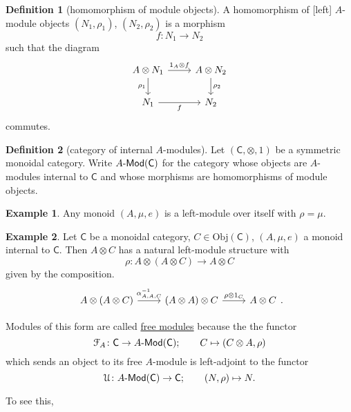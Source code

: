 \documentclass[a4paper,10pt]{scrreprt}
\newcommand{\defn}[1]{\ul{#1}}
\newcommand{\Obj}{\mathrm{Obj}}
\def\mhyp{{\hbox{-}}}
\theoremstyle{definition}
\newtheorem{definition}{Definition}[section]
\newtheorem{example}{Example}[section]
\theoremstyle{plain}
\theoremstyle{remark}
\begin{document}
\begin{definition}[homomorphism of module objects]
  \label{def:homomorphismofmoduleobjects}
  A homomorphism of [left] $A$-module objects $(N_{1}, \rho_{1})$, $(N_{2}, \rho_{2})$ is a morphism
  \begin{equation*}
    f\colon N_{1} \to N_{2}
  \end{equation*}
  such that the diagram
  \begin{equation*}
    \begin{tikzcd}
      A \otimes N_{1}
      \arrow[r, "1_{A} \otimes f"]
      \arrow[d, swap, "\rho_{1}"]
      & A \otimes N_{2}
      \arrow[d, "\rho_{2}"]
      \\
      N_{1}
      \arrow[r, swap, "f"]
      & N_{2}
    \end{tikzcd}
  \end{equation*}
  commutes.
\end{definition}

\begin{definition}[category of internal $A$-modules]
  \label{def:categoryofinternalmodules}
  Let $(\mathsf{C}, \otimes, 1)$ be a symmetric monoidal category. Write $A\mhyp\mathsf{Mod}(\mathsf{C})$ for the category whose objects are $A$-modules internal to $\mathsf{C}$ and whose morphisms are homomorphisms of module objects.
\end{definition}

\begin{example}
  \label{eg:anyringisamoduleoveritself}
  Any monoid $(A, \mu, e)$ is a left-module over itself with $\rho = \mu$.
\end{example}

\begin{example}
  \label{eg:freemodule}
  Let $\mathsf{C}$ be a monoidal category, $C \in \Obj(\mathsf{C})$, $(A, \mu, e)$ a monoid internal to $\mathsf{C}$. Then $A \otimes C$ has a natural left-module structure with
  \begin{equation*}
    \rho\colon A \otimes (A \otimes C) \to A \otimes C
  \end{equation*}
  given by the composition.
  \begin{equation*}
    \begin{tikzcd}
      A \otimes (A \otimes C)
      \arrow[r, "{\alpha_{A, A ,C}^{-1}}"]
      & (A \otimes A) \otimes C
      \arrow[r, "\rho \otimes 1_{C}"]
      & A \otimes C
    \end{tikzcd}.
  \end{equation*}

  Modules of this form are called \defn{free modules} because the the functor 
  \begin{equation*}
    \mathcal{F}_{A}\colon \mathsf{C} \to A\mhyp\mathsf{Mod}(\mathsf{C});\qquad C \mapsto (C \otimes A, \rho)
  \end{equation*}
  which sends an object to its free $A$-module is left-adjoint to the functor 
  \begin{equation*}
    \mathcal{U}\colon A\mhyp\mathsf{Mod}(\mathsf{C}) \to \mathsf{C};\qquad (N, \rho) \mapsto N.
  \end{equation*}

  To see this,
\end{example}
\end{document}
